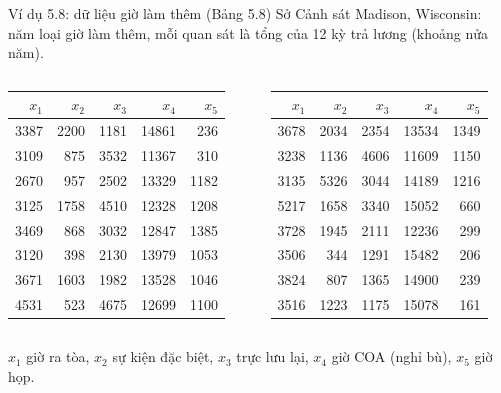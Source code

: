 \begin{frame}{Ví dụ 5.8: dữ liệu giờ làm thêm (Bảng 5.8)}
  Sở Cảnh sát Madison, Wisconsin: năm loại giờ làm thêm, mỗi quan sát là tổng của 12 kỳ trả lương (khoảng nửa năm).
  \begin{columns}[T]
    \centering\scriptsize
    \begin{tabular}{rrrrr}
      \toprule
      \(x_1\) & \(x_2\) & \(x_3\) & \(x_4\) & \(x_5\) \\
      \midrule
      3387 & 2200 & 1181 & 14861 & 236 \\
      3109 & 875 & 3532 & 11367 & 310 \\
      2670 & 957 & 2502 & 13329 & 1182 \\
      3125 & 1758 & 4510 & 12328 & 1208 \\
      3469 & 868 & 3032 & 12847 & 1385 \\
      3120 & 398 & 2130 & 13979 & 1053 \\
      3671 & 1603 & 1982 & 13528 & 1046 \\
      4531 & 523 & 4675 & 12699 & 1100 \\
      \bottomrule
    \end{tabular}
    \centering\scriptsize
    \begin{tabular}{rrrrr}
      \toprule
      \(x_1\) & \(x_2\) & \(x_3\) & \(x_4\) & \(x_5\) \\
      \midrule
      3678 & 2034 & 2354 & 13534 & 1349 \\
      3238 & 1136 & 4606 & 11609 & 1150 \\
      3135 & 5326 & 3044 & 14189 & 1216 \\
      5217 & 1658 & 3340 & 15052 & 660 \\
      3728 & 1945 & 2111 & 12236 & 299 \\
      3506 & 344 & 1291 & 15482 & 206 \\
      3824 & 807 & 1365 & 14900 & 239 \\
      3516 & 1223 & 1175 & 15078 & 161 \\
      \bottomrule
    \end{tabular}
  \end{columns}
  {\scriptsize \(x_1\) giờ ra tòa, \(x_2\) sự kiện đặc biệt, \(x_3\) trực lưu lại, \(x_4\) giờ COA (nghỉ bù), \(x_5\) giờ họp.}
\end{frame}

